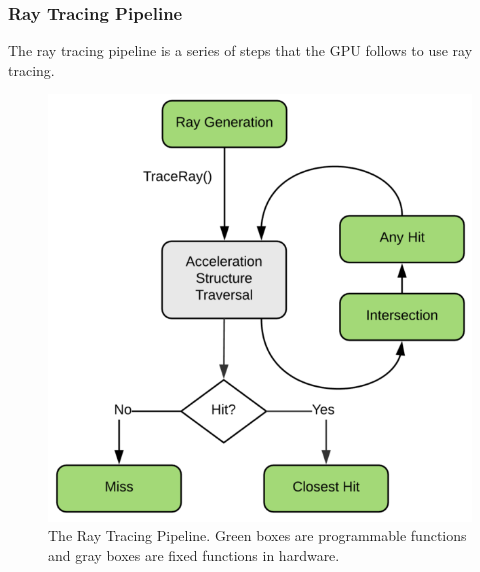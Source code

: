 \documentclass[12pt]{article}
\begin{document}
\subsubsection{Ray Tracing Pipeline}

The ray tracing pipeline is a series of steps that the GPU follows to use ray tracing.

\begin{figure}[H]
    \begin{center}
        \includegraphics[scale=0.25]{RayTracing-Pipeline}
    \end{center}
    \caption{
        The Ray Tracing Pipeline.
        Green boxes are programmable functions and gray boxes are fixed functions in hardware.
        \parencite{NVIDIA:DXR-Intro}
    }
    \label{fig:RayTracing-Pipeline}
\end{figure}
\end{document}
